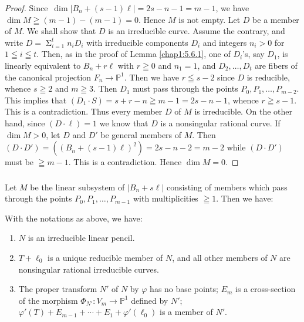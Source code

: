 \begin{proof}
Since\pageoriginale\ $\dim|B_{n}+(s-1)\ell|=2s-n-1=m-1$, we have $\dim
M\geqq (m-1)-(m-1)=0$. Hence $M$ is not empty. Let $D$ be a member of
$M$. We shall show that $D$ is an irreducible curve. Assume the
contrary, and write
$D={\displaystyle{\mathop{\Sigma}^{t}_{i=1}}}n_{i}D_{i}$ with
irreducible components $D_{i}$ and integers $n_{i}>0$ for $1\leqq
i\leqq t$. Then, as in the proof of Lemma \ref{chap1:5.6.1}, one of
$D_{i}$'s, say $D_{1}$, is linearly equivalent to $B_{n}+r\ell$ with
$r\geqq 0$ and $n_{1}=1$, and $D_{2},\ldots,D_{t}$ are fibers of the
canonical projection $F_{n}\to \mathbb{P}^{1}$. Then we have $r\leqq
s-2$ since $D$ is reducible, whence $s\geqq 2$ and $m\geqq 3$. Then
$D_{1}$ must pass through the points
$P_{0},P_{1},\ldots,P_{m-2}$. This implies that $(D_{1}\cdot
S)=s+r-n\geqq m-1=2s-n-1$, whence $r\geqq s-1$. This is a
contradiction. Thus every member $D$ of $M$ is irreducible. On the
other hand, since $(D\cdot\ell)=1$ we know that $D$ is a nonsingular
rational curve. If $\dim M>0$, let $D$ and $D'$ be general members of
$M$. Then $(D\cdot D')=((B_{n}+(s-1)\ell)^{2})=2s-n-2=m-2$ while
$(D\cdot D')$ must be $\geqq m-1$. This is a contradiction. Hence
$\dim M=0$.
\end{proof}

\subsubsection{}\label{chap1:5.7.2}
Let $M$ be the linear subsystem of $|B_{n}+s\ell|$ consisting of
members which pass through the points $P_{0},P_{1},\ldots,P_{m-1}$
with multiplicities $\geqq 1$. Then we have:

\begin{lemma*}
With the notations as above, we have:
\begin{enumerate}
\renewcommand{\labelenumi}{\rm(\theenumi)}
\item $N$ is an irreducible linear pencil.

\item $T+\ell_{0}$ is a unique reducible member of $N$, and all other
  members of $N$ are nonsingular rational irreducible curves.

\item The proper transform $N'$ of $N$ by $\varphi$ has no base
  points; $E_{m}$ is a cross-section of the morphism
  $\Phi_{N'}:V_{m}\to \mathbb{P}^{1}$ defined by $N'$;\pageoriginale\
  $\varphi'(T)+E_{m-1}+\cdots+E_{1}+\varphi'(\ell_{0})$ is a member of $N'$.
\end{enumerate}
\end{lemma*}

